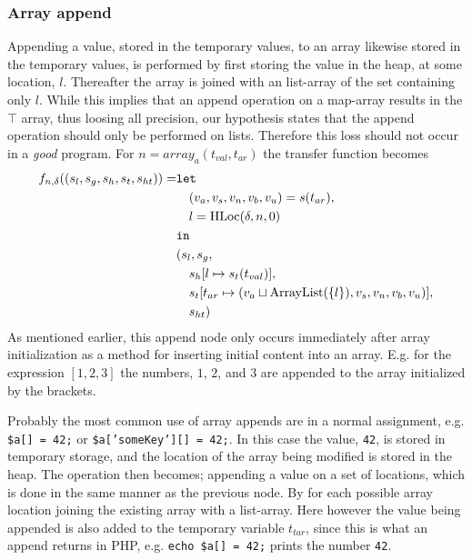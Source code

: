 \subsubsection{Array append}
Appending a value, stored in the temporary values, to an array likewise stored in the temporary values, is performed by first storing the value in the heap, at some location, $l$. Thereafter the array is joined with an list-array of the set containing only $l$. While this implies that an append operation on a map-array results in the $\top$ array, thus loosing all precision, our hypothesis states that the append operation should only be performed on lists. Therefore this loss should not occur in a \emph{good} program. For $n = \mathit{array}_a(t_{val},t_{ar})$ the transfer function becomes
\begin{align}
f_{n,\delta}((s_l, s_g, s_h, s_t, s_{ht})) = & \texttt{let } \notag\\
                                    & \quad (v_a,v_s,v_n,v_b,v_u) = s(t_{ar}), \notag\\
                                    & \quad l = \text{HLoc}(\delta, n, 0)\notag\\
                                    & \texttt{in } \notag\\
                                    &(s_l,s_g,\notag\\
                                    &\quad s_h[l\mapsto s_t(t_{val})], \notag\\
                                    &\quad s_t[t_{ar} \mapsto (v_a \sqcup \text{ArrayList}(\{l\}),v_s, v_n, v_b, v_u)],\notag\\
                                    &\quad s_{ht})
\end{align}
As mentioned earlier, this append node only occurs immediately after array initialization as a method for inserting initial content into an array. E.g. for the expression $[1,2,3]$ the numbers, $1$, $2$, and $3$ are appended to the array initialized by the brackets.

Probably the most common use of array appends are in a normal assignment, e.g. \texttt{\$a[] = 42;} or \texttt{\$a['someKey'][] = 42;}. In this case the value, \texttt{42}, is stored in temporary storage, and the location of the array being modified is stored in the heap. The operation then becomes; appending a value on a set of locations, which is done in the same manner as the previous node. By for each possible array location joining the existing array with a list-array. Here however the value being appended is also added to the temporary variable $t_{tar}$, since this is what an append returns in PHP, e.g. \texttt{echo \$a[] = 42;} prints the number \texttt{42}. 


